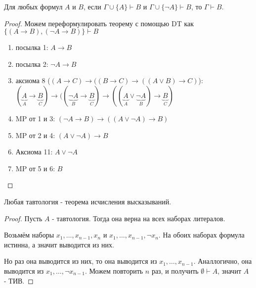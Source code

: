 \begin{lemma} \label{logic_collapse} \thmslashn

    Для любых формул $A$ и $B$, если $\Gamma \cup \{A\} \vdash B$ и $\Gamma \cup \{\neg A\} \vdash B $, то $\Gamma \vdash B$.
    \begin{proof} \thmslashn

        Можем переформулировать теорему с помощью DT как $\{(A \to B), (\neg A \to B)\} \vdash B $ 
        \begin{enumerate}
            \item посылка 1: $A\to B$
            \item посылка 2: $\neg A \to B$
            \item аксиома 8 ($(A \to C) \to ((B \to C) \to ((A \lor B) \to C)$): \\
                $(\underbrace{A}_{A} \to \underbrace{B}_{C}) \to ((\underbrace{\neg A}_{B} \to \underbrace{B}_{C}) \to ((\underbrace{A}_{A} \lor \underbrace{\neg A}_{B} ) \to \underbrace{B}_{C} ) $
            \item MP от 1 и 3: $(\neg A \to B) \to ((A \lor \neg A) \to B)$
            \item MP от 2 и 4: $(A \lor \neg A) \to B$
            \item Аксиома 11: $A \lor \neg A$
            \item MP от 5 и 6: $B$ \qedhere
        \end{enumerate}
    \end{proof}
\end{lemma}
\begin{theorem} \label{logic_completeness_1} \thmslashn

    Любая тавтология - теорема исчисления высказываний.
    \begin{proof} \thmslashn

        Пусть $A$ - тавтология. Тогда она верна на всех наборах литералов.

        Возьмём наборы $x_1, \ldots, x_{n-1}, x_{n}$ и $x_1, \ldots, x_{n-1}, \neg x_{n}$. На обоих наборах формула истинна, а значит выводится из них. 

        Но раз она выводится из них, то она выводится из $x_1, \ldots, x_{n-1}$. Аналлогично, она выводится из $x_1, \ldots, \neg x_{n-1}$. Можем повторить $n$ раз, и получить $ \emptyset \vdash A$, значит $A$ - ТИВ.
    \end{proof}
\end{theorem}
